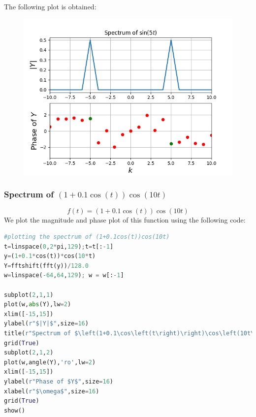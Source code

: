 \documentclass[11pt, a4paper]{article}
\begin{document}
The following plot is obtained:
\begin{figure}[H]
     \centering
     \includegraphics[scale=0.8]{Figure_2.png}
\end{figure}

\subsubsection{Spectrum of \textbf{$(1+0.1\cos(t))\cos(10t)$}}

\begin{equation*}
    f(t) = (1 + 0.1\cos(t))\cos(10t)
\end{equation*}
We plot the magnitude and phase plot of this function using the following code:
\begin{lstlisting}[language = Python]
#plotting the spectrum of (1+0.1cos(t))cos(10t)
t=linspace(0,2*pi,129);t=t[:-1]
y=(1+0.1*cos(t))*cos(10*t)
Y=fftshift(fft(y))/128.0
w=linspace(-64,64,129); w = w[:-1]

subplot(2,1,1)
plot(w,abs(Y),lw=2)
xlim([-15,15])
ylabel(r"$|Y|$",size=16)
title(r"Spectrum of $\left(1+0.1\cos\left(t\right)\right)\cos\left(10t\right)$")
grid(True)
subplot(2,1,2)
plot(w,angle(Y),'ro',lw=2)
xlim([-15,15])
ylabel(r"Phase of $Y$",size=16)
xlabel(r"$\omega$",size=16)
grid(True)
show()
\end{lstlisting}
\end{document}
